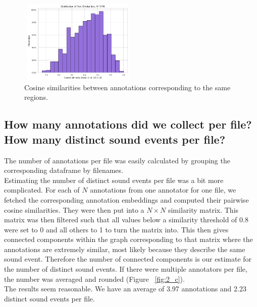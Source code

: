 \begin{figure}[htbp]
  \centering
  \includegraphics[width=0.5\textwidth, height=4cm]{figs/sim_diffs.png}
  \caption{Cosine similarities between annotations corresponding to the same regions.}
  \label{fig:2_b}
\end{figure}

\subsection{How many annotations did we collect per file? How many distinct sound events per file?}
\label{sec:Annotation Quality:a2}
The number of annotations per file was easily calculated by grouping the corresponding dataframe by filenames. \\
Estimating the number of distinct sound events per file was a bit more complicated. For each of $N$ annotations from one annotator for one file, we fetched the corresponding annotation embeddings and computed their pairwise cosine similarities. They were then put into a $N \times N$ similarity matrix. This matrix was then filtered such that all values below a similarity threshold of 0.8 were set to 0 and all others to 1 to turn the matrix into. This then gives connected components within the graph corresponding to that matrix where the annotations are extremely similar, most likely because they describe the same sound event. Therefore the number of connected components is our estimate for the number of distinct sound events. If there were multiple annotators per file, the number was averaged and rounded (Figure ~\ref{fig:2_c}). \\
The results seem reasonable. We have an average of 3.97 annotations and 2.23 distinct sound events per file.

